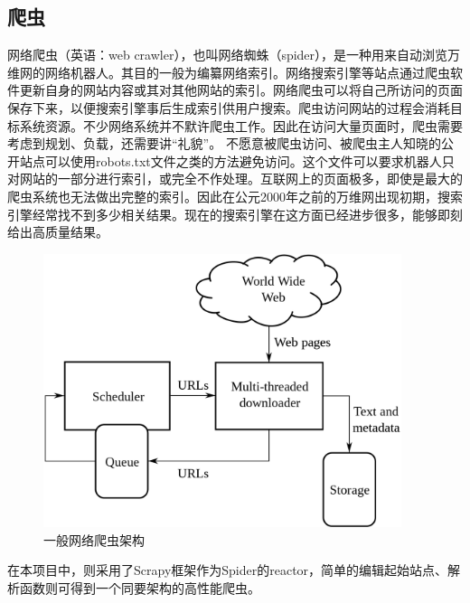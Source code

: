 \documentclass{article}
\begin{document}
\begin{CJK*}{UTF8}{gbsn}
\section{爬虫}
\qquad 网络爬虫（英语：web crawler），也叫网络蜘蛛（spider），是一种用来自动浏览万维网的网络机器人。其目的一般为编纂网络索引。网络搜索引擎等站点通过爬虫软件更新自身的网站内容或其对其他网站的索引。网络爬虫可以将自己所访问的页面保存下来，以便搜索引擎事后生成索引供用户搜索。爬虫访问网站的过程会消耗目标系统资源。不少网络系统并不默许爬虫工作。因此在访问大量页面时，爬虫需要考虑到规划、负载，还需要讲“礼貌”。 不愿意被爬虫访问、被爬虫主人知晓的公开站点可以使用robots.txt文件之类的方法避免访问。这个文件可以要求机器人只对网站的一部分进行索引，或完全不作处理。互联网上的页面极多，即使是最大的爬虫系统也无法做出完整的索引。因此在公元2000年之前的万维网出现初期，搜索引擎经常找不到多少相关结果。现在的搜索引擎在这方面已经进步很多，能够即刻给出高质量结果。\cite{crawler}

\begin{figure}[H]
\centering
\includegraphics[height=8cm]{WebCrawlerArchitecture.svg.png}
\caption{一般网络爬虫架构\cite{crawler}}
\end{figure}
在本项目中，则采用了Scrapy框架作为Spider的reactor，简单的编辑起始站点、解析函数则可得到一个同要架构的高性能爬虫。

\end{CJK*}
\end{document}
